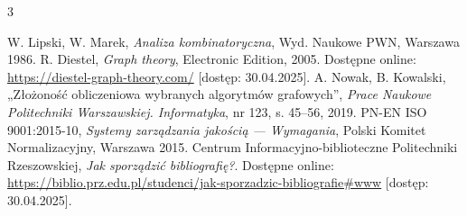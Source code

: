 \documentclass[12pt,a4paper,twoside]{report}
\theoremstyle{definition} %
\begin{document}
    
    \cleardoublepage
    


    \begin{thebibliography}{3}
	  W. Lipski, W. Marek, \emph{Analiza kombinatoryczna}, Wyd. Naukowe PWN, Warszawa 1986.
	 R. Diestel, \emph{Graph theory}, Electronic Edition, 2005. Dostępne online: \url{https://diestel-graph-theory.com/} [dostęp: 30.04.2025].
         A. Nowak, B. Kowalski, „Złożoność obliczeniowa wybranych algorytmów grafowych”, \emph{Prace Naukowe Politechniki Warszawskiej. Informatyka}, nr 123, s. 45–56, 2019.
         PN-EN ISO 9001:2015-10, \emph{Systemy zarządzania jakością — Wymagania}, Polski Komitet Normalizacyjny, Warszawa 2015.
         Centrum Informacyjno-biblioteczne Politechniki Rzeszowskiej, \emph{Jak sporządzić bibliografię?}. Dostępne online: \url{https://biblio.prz.edu.pl/studenci/jak-sporzadzic-bibliografie#www} [dostęp: 30.04.2025].
        
	\end{thebibliography}
    \cleardoublepage



	
\end{document}
